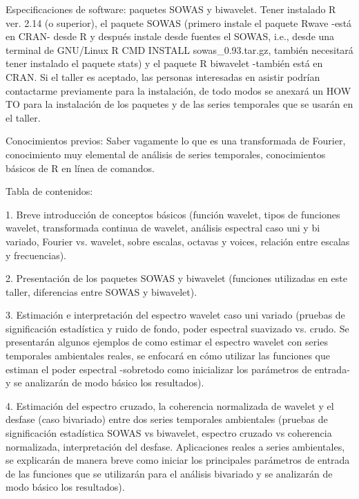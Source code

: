 Especificaciones de software: paquetes SOWAS y biwavelet.
Tener instalado R ver. 2.14 (o superior), el paquete SOWAS (primero instale el paquete Rwave -está en CRAN- desde R y después instale desde fuentes el SOWAS, i.e., desde una terminal de GNU/Linux  R CMD INSTALL sowas\_0.93.tar.gz, también necesitará tener instalado el paquete stats) y el paquete R biwavelet -también está en CRAN. Si el taller es aceptado, las personas interesadas en asistir podrían contactarme previamente para la instalación, de todo modos se anexará un HOW TO para la instalación de los paquetes y de las series temporales que se usarán en el taller. 


Conocimientos previos: 
Saber vagamente lo que es una transformada de Fourier, conocimiento muy elemental de análisis  de series temporales, conocimientos básicos de R en línea de comandos. 


Tabla de contenidos: 

1. Breve introducción de conceptos básicos (función wavelet, tipos de funciones wavelet, transformada continua de wavelet, análisis espectral caso uni y bi variado, Fourier vs. wavelet, sobre escalas,  octavas y voices, relación entre escalas y frecuencias).  

2. Presentación de los paquetes SOWAS y biwavelet (funciones utilizadas en este taller, diferencias entre SOWAS y biwavelet). 

3. Estimación e interpretación del espectro wavelet caso uni variado (pruebas de significación estadística y ruido de fondo, poder espectral suavizado vs. crudo. Se presentarán algunos ejemplos de como estimar el espectro wavelet con series temporales ambientales reales, se enfocará en cómo utilizar las funciones que estiman el poder espectral -sobretodo como inicializar los parámetros de entrada-  y se analizarán de modo básico los resultados). 

4. Estimación del espectro cruzado, la coherencia normalizada de wavelet y el desfase (caso bivariado) entre dos series temporales ambientales (pruebas de significación estadística SOWAS vs biwavelet, espectro cruzado vs coherencia normalizada, interpretación del desfase. Aplicaciones reales a series ambientales, se explicarán de manera breve como iniciar los principales parámetros de entrada de las funciones que se utilizarán para el análisis bivariado y se analizarán de modo básico los resultados). 



%

%
